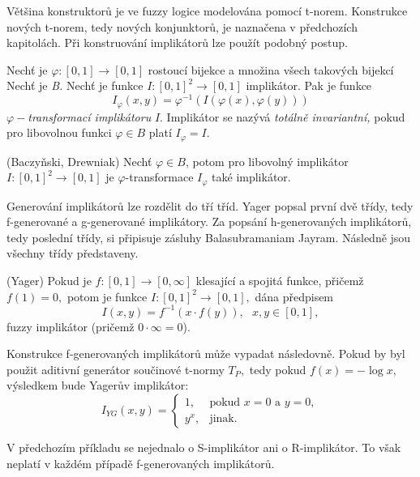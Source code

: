 Většina konstruktor\r u je ve fuzzy logice modelována pomocí t-norem. Konstrukce nových t-norem, tedy nových konjunktor\r u, je naznačena v předchozích kapitolách. Při konstruování implikátor\r u lze použít podobný postup.

\begin{definition}
    Nech\v t je $\varphi:[0,1] \rightarrow [0,1]$  rostoucí
    bijekce a množina všech takových bijekcí Nech\v t je {\em B.} Nech\v t je funkce
    $I:[0,1]^2\rightarrow [0,1]$ 
    implikátor.
    Pak je funkce
    $$I_\varphi(x,y)=\varphi^{-1}(I(\varphi (x), \varphi (y)))$$
    $\varphi-${\em transformací implikátoru} $I.$ Implikátor se nazývá
    {\em totálně invariantní,} pokud pro libovolnou funkci $\varphi \in B$ platí $I_\varphi=I.$\\
\end{definition}

\begin{sentence}(Baczy\v nski, Drewniak)
    Nech\v t $\varphi \in B$, potom pro libovolný implikátor $I: [0,1]^2 \rightarrow [0,1]$ je $\varphi$-transformace $I_\varphi$ také implikátor.
\end{sentence}

Generování implikátor\r u lze rozdělit do tří tříd. Yager popsal první dvě třídy, tedy f-generované a g-generované implikátory. Za popsání  h-generovaných implikátor\r u, tedy poslední třídy, si připisuje zásluhy Balasubramaniam Jayram. Následně jsou všechny třídy představeny.

\begin{sentence}(Yager) 
Pokud je $f: [0,1] \to [0,\infty]$ klesající a spojitá funkce,
přičemž $f(1) = 0,$ potom je funkce $I: [0,1]^2 \to [0,1],$ dána předpisem
$$I(x,y) = f^{-1}(x \cdot f(y)), \mbox {   } x, y \in [0,1],$$
fuzzy implikátor (pričemž $0 \cdot \infty = 0$). \\
\end{sentence}

\begin{example}
    \cite{hlinena}
    Konstrukce f-generovaných implikátor\r u m\r uže vypadat následovně.
    Pokud by byl použit aditivní generátor součinové t-normy $T_P,$ tedy 
    pokud $f(x) = - \log x,$ výsledkem bude Yager\r uv implikátor:
    $$I_{YG}(x,y)= \begin{cases} 1,
    &\mbox {pokud $x=0$ a $y=0,$} \\
    y^x, &\mbox {jinak.}
    \end{cases}$$
\end{example}
\begin{remark}
    V předchozím příkladu se nejednalo o S-implikátor ani o R-implikátor. To však neplatí v každém případě f-generovaných implikátor\r u.
\end{remark}


